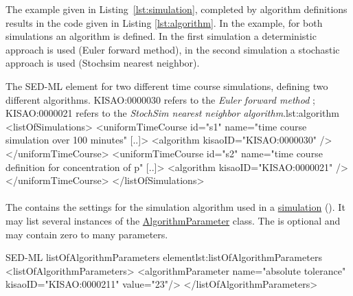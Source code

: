 
The example given in Listing~\ref{lst:simulation}, completed by algorithm definitions results in the code given in Listing \ref{lst:algorithm}. In the example, for both simulations an algorithm is defined. In the first simulation  a deterministic approach is used (Euler forward method), in the second simulation  a stochastic approach is used (Stochsim nearest neighbor).

\begin{myXmlLst}{The SED-ML  element for two different time course simulations, defining two different algorithms. KISAO:0000030 refers to the \emph{Euler forward method} ; KISAO:0000021 refers to the \emph{StochSim nearest neighbor algorithm}.}{lst:algorithm}
<listOfSimulations>
	<uniformTimeCourse id="s1" name="time course simulation over 100 minutes" [..]>
		<algorithm kisaoID="KISAO:0000030" />
	</uniformTimeCourse>
	<uniformTimeCourse id="s2" name="time course definition for concentration of p" [..]>
		<algorithm kisaoID="KISAO:0000021" />
	</uniformTimeCourse>
</listOfSimulations>
\end{myXmlLst}


\paragraph*{}
\label{class:listOfAlgorithmParameters}
The  contains the settings for the simulation algorithm used in a \hyperref[class:simulation]{simulation} (). It may list several instances of the \hyperref[class:algorithmParameter]{AlgorithmParameter} class. The  is optional and may contain zero to many parameters.

\begin{myXmlLst}{SED-ML listOfAlgorithmParameters element}{lst:listOfAlgorithmParameters}
<listOfAlgorithmParameters>
	<algorithmParameter name="absolute tolerance" kisaoID="KISAO:0000211" value="23"/> 
</listOfAlgorithmParameters>
\end{myXmlLst}


